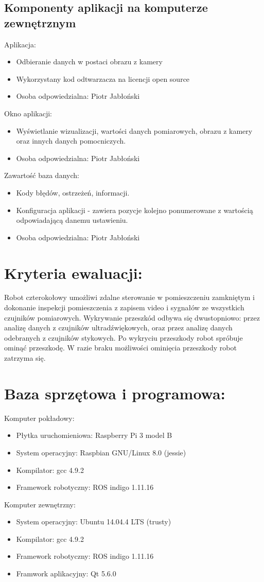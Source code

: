 \documentclass[a4paper]{article}
\begin{document}
\subsection{Komponenty aplikacji na komputerze zewnętrznym}
Aplikacja:
\begin{itemize}
    \item Odbieranie danych w postaci obrazu z kamery
    \item Wykorzystany kod odtwarzacza na licencji open source
    \item Osoba odpowiedzialna: Piotr Jabłoński
\end{itemize}
Okno aplikacji:
\begin{itemize}
    \item Wyświetlanie wizualizacji, wartości danych pomiarowych, obrazu z kamery oraz innych danych pomocniczych.
    \item Osoba odpowiedzialna: Piotr Jabłoński
\end{itemize}
Zawartość baza danych:
\begin{itemize}
    \item Kody błędów, ostrzeżeń, informacji.
    \item Konfiguracja aplikacji - zawiera pozycje kolejno ponumerowane z wartością odpowiadającą danemu ustawieniu.
    \item Osoba odpowiedzialna: Piotr Jabłoński
\end{itemize}


\section{ Kryteria ewaluacji:}

Robot czterokołowy umożliwi zdalne sterowanie w pomieszczeniu zamkniętym i dokonanie inspekcji pomieszczenia z zapisem video i sygnałów ze wszystkich czujników pomiarowych. Wykrywanie przeszkód odbywa się dwustopniowo: przez analizę danych z czujników ultradźwiękowych, oraz przez analizę danych odebranych z czujników stykowych. Po wykryciu przeszkody robot spróbuje ominąć przeszkodę. W razie braku możliwości ominięcia przeszkody robot zatrzyma się.

\section{ Baza sprzętowa i programowa:}
Komputer pokładowy:
\begin{itemize}
\item Płytka uruchomieniowa: Raspberry Pi 3 model B
\item System operacyjny:     Raspbian GNU/Linux 8.0 (jessie)
\item Kompilator:            gcc 4.9.2
\item Framework robotyczny:  ROS indigo 1.11.16
\end{itemize}

\newpage

Komputer zewnętrzny:
\begin{itemize}
\item System operacyjny:     Ubuntu 14.04.4 LTS (trusty)
\item Kompilator:            gcc 4.9.2
\item Framework robotyczny:  ROS indigo 1.11.16
\item Framwork aplikacyjny: Qt 5.6.0
\end{itemize}
\end{document}

